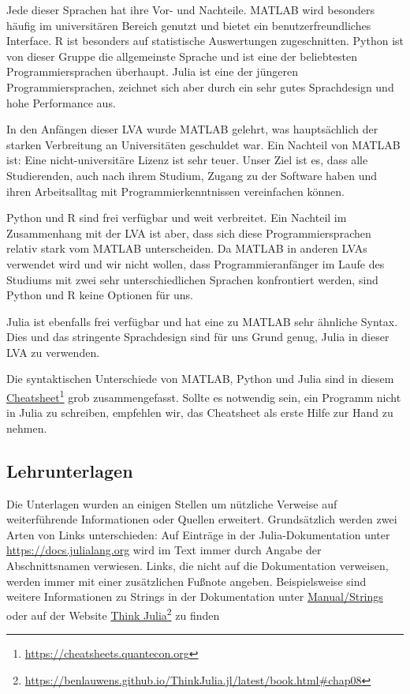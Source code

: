 Jede dieser Sprachen hat ihre Vor- und Nachteile.
MATLAB wird besonders häufig im universitären Bereich genutzt und bietet ein benutzerfreundliches Interface.
R ist besonders auf statistische Auswertungen zugeschnitten.
Python ist von dieser Gruppe die allgemeinste Sprache und ist eine der beliebtesten Programmiersprachen überhaupt.
Julia ist eine der jüngeren Programmiersprachen, zeichnet sich aber durch ein sehr gutes Sprachdesign und hohe Performance aus.

In den Anfängen dieser LVA wurde MATLAB gelehrt, was hauptsächlich der starken Verbreitung an Universitäten geschuldet war.
Ein Nachteil von MATLAB ist: Eine nicht-universitäre Lizenz ist sehr teuer.
Unser Ziel ist es, dass alle Studierenden, auch nach ihrem Studium, Zugang zu der Software haben und ihren Arbeitsalltag mit Programmierkenntnissen vereinfachen können.

Python und R sind frei verfügbar und weit verbreitet.
Ein Nachteil im Zusammenhang mit der LVA ist aber, dass sich diese Programmiersprachen relativ stark vom MATLAB unterscheiden.
Da MATLAB in anderen LVAs verwendet wird und wir nicht wollen, dass Programmieranfänger im Laufe des Studiums mit zwei sehr unterschiedlichen Sprachen konfrontiert werden, sind Python und R keine Optionen für uns.

Julia ist ebenfalls frei verfügbar und hat eine zu MATLAB sehr ähnliche Syntax.
Dies und das stringente Sprachdesign sind für uns Grund genug, Julia in dieser LVA zu verwenden.

Die syntaktischen Unterschiede von MATLAB, Python und Julia sind in diesem \href{https://cheatsheets.quantecon.org/}{Cheatsheet}\footnote{\href{https://cheatsheets.quantecon.org}{https://cheatsheets.quantecon.org}} grob zusammengefasst.
Sollte es notwendig sein, ein Programm nicht in Julia zu schreiben, empfehlen wir, das Cheatsheet als erste Hilfe zur Hand zu nehmen.

\subsection{Lehrunterlagen}

Die Unterlagen wurden an einigen Stellen um nützliche Verweise auf weiterführende Informationen oder Quellen erweitert.
Grundsätzlich werden zwei Arten von Links unterschieden:
Auf Einträge in der Julia-Dokumentation unter \href{https://docs.julialang.org}{https://docs.julialang.org} wird im Text immer durch Angabe der Abschnittsnamen verwiesen.
Links, die nicht auf die Dokumentation verweisen, werden immer mit einer zusätzlichen Fußnote angeben.
Beispielsweise sind weitere Informationen zu Strings in der Dokumentation unter \href{https://docs.julialang.org/en/v1/manual/strings/}{Manual/Strings} oder auf der Website \href{https://benlauwens.github.io/ThinkJulia.jl/latest/book.html\#chap08}{Think Julia}\footnote{\href{https://benlauwens.github.io/ThinkJulia.jl/latest/book.html\#chap08}{https://benlauwens.github.io/ThinkJulia.jl/latest/book.html\#chap08}} zu finden

